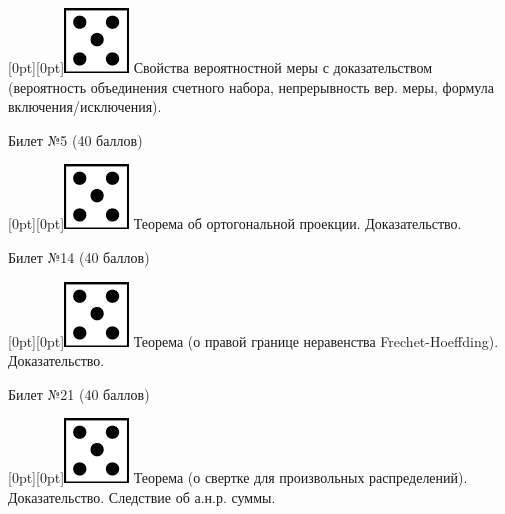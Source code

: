 \documentclass[10pt]{article}
\begin{document}
\raisebox{-1pt}[0pt][0pt]{\includegraphics[width=0.02\linewidth]{5.png}} Свойства  вероятностной меры с доказательством (вероятность объединения счетного набора, непрерывность вер. меры, формула включения/исключения). \\

\begin{center} {\Large Билет №5 (40 баллов)} \end{center}

\raisebox{-1pt}[0pt][0pt]{\includegraphics[width=0.02\linewidth]{5.png}} Теорема об ортогональной проекции. Доказательство. \\

\begin{center} {\Large Билет №14 (40 баллов)} \end{center}

\raisebox{-1pt}[0pt][0pt]{\includegraphics[width=0.02\linewidth]{5.png}} Теорема (о правой границе неравенства Frechet-Hoeffding).  Доказательство. \\

\begin{center} {\Large Билет №21 (40 баллов)} \end{center}

\raisebox{-1pt}[0pt][0pt]{\includegraphics[width=0.02\linewidth]{5.png}} Теорема (о свертке для произвольных распределений). Доказательство. Следствие об а.н.р. суммы. \\ 
\end{document}

